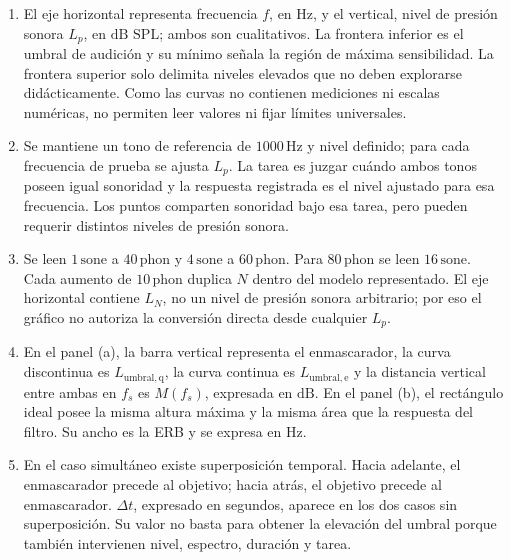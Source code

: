 \begin{enumerate}[label=\textbf{I\arabic*.},leftmargin=*]
    \item El eje horizontal representa frecuencia \(f\), en
    \(\text{Hz}\), y el vertical, nivel de presión sonora \(L_p\), en
    \(\text{dB SPL}\); ambos son cualitativos. La frontera inferior es el
    umbral de audición y su mínimo señala la región de máxima sensibilidad. La
    frontera superior solo delimita niveles elevados que no deben explorarse
    didácticamente. Como las curvas no contienen mediciones ni escalas
    numéricas, no permiten leer valores ni fijar límites universales.

    \item Se mantiene un tono de referencia de \(1000\,\text{Hz}\) y nivel
    definido; para cada frecuencia de prueba se ajusta \(L_p\). La tarea es
    juzgar cuándo ambos tonos poseen igual sonoridad y la respuesta registrada
    es el nivel ajustado para esa frecuencia. Los puntos comparten sonoridad
    bajo esa tarea, pero pueden requerir distintos niveles de presión sonora.

    \item Se leen \(1\,\text{sone}\) a \(40\,\text{phon}\) y
    \(4\,\text{sone}\) a \(60\,\text{phon}\). Para
    \(80\,\text{phon}\) se leen \(16\,\text{sone}\). Cada aumento de
    \(10\,\text{phon}\) duplica \(N\) dentro del modelo representado. El eje
    horizontal contiene \(L_N\), no un nivel de presión sonora arbitrario;
    por eso el gráfico no autoriza la conversión directa desde cualquier
    \(L_p\).

    \item En el panel (a), la barra vertical representa el enmascarador, la
    curva discontinua es \(L_{\mathrm{umbral,q}}\), la curva continua es
    \(L_{\mathrm{umbral,e}}\) y la distancia vertical entre ambas en \(f_s\)
    es \(M(f_s)\), expresada en \(\text{dB}\). En el panel (b), el rectángulo
    ideal posee la misma altura máxima y la misma área que la respuesta del
    filtro. Su ancho es la ERB y se expresa en \(\text{Hz}\).

    \item En el caso simultáneo existe superposición temporal. Hacia adelante,
    el enmascarador precede al objetivo; hacia atrás, el objetivo precede al
    enmascarador. \(\Delta t\), expresado en segundos, aparece en los dos
    casos sin superposición. Su valor no basta para obtener la elevación del
    umbral porque también intervienen nivel, espectro, duración y tarea.


\end{enumerate}
